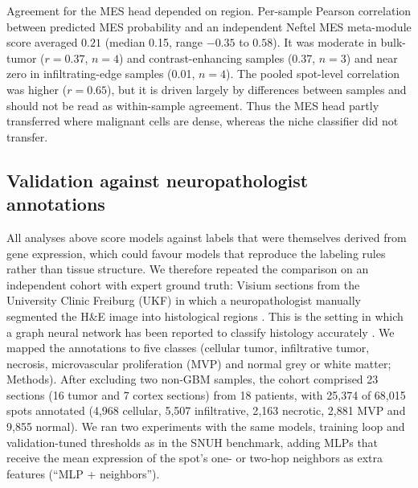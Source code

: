 \documentclass[11pt,letterpaper]{article}
\begin{document}
Agreement for the MES head depended on region. Per-sample Pearson correlation between predicted MES probability and an independent Neftel MES meta-module score \cite{neftel2019} averaged $0.21$ (median 0.15, range $-0.35$ to $0.58$). It was moderate in bulk-tumor ($r = 0.37$, $n = 4$) and contrast-enhancing samples (0.37, $n = 3$) and near zero in infiltrating-edge samples (0.01, $n = 4$). The pooled spot-level correlation was higher ($r = 0.65$), but it is driven largely by differences between samples and should not be read as within-sample agreement. Thus the MES head partly transferred where malignant cells are dense, whereas the niche classifier did not transfer.

\subsection{Validation against neuropathologist annotations}

All analyses above score models against labels that were themselves derived from gene expression, which could favour models that reproduce the labeling rules rather than tissue structure. We therefore repeated the comparison on an independent cohort with expert ground truth: Visium sections from the University Clinic Freiburg (UKF) \cite{ravi2022} in which a neuropathologist manually segmented the H\&E image into histological regions \cite{ritter2025}. This is the setting in which a graph neural network has been reported to classify histology accurately \cite{ritter2025}. We mapped the annotations to five classes (cellular tumor, infiltrative tumor, necrosis, microvascular proliferation (MVP) and normal grey or white matter; Methods). After excluding two non-GBM samples, the cohort comprised 23 sections (16 tumor and 7 cortex sections) from 18 patients, with 25{,}374 of 68{,}015 spots annotated (4{,}968 cellular, 5{,}507 infiltrative, 2{,}163 necrotic, 2{,}881 MVP and 9{,}855 normal). We ran two experiments with the same models, training loop and validation-tuned thresholds as in the SNUH benchmark, adding MLPs that receive the mean expression of the spot's one- or two-hop neighbors as extra features (``MLP + neighbors'').
\end{document}
